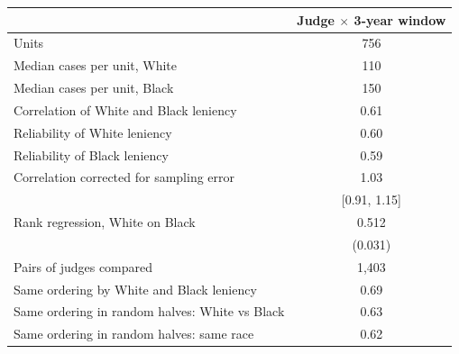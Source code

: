 \begin{tabular}{lc}
\toprule
 & Judge $\times$ 3-year window \\
\midrule
Units & 756 \\
Median cases per unit, White & 110 \\
Median cases per unit, Black & 150 \\
\addlinespace
Correlation of White and Black leniency & 0.61 \\
Reliability of White leniency & 0.60 \\
Reliability of Black leniency & 0.59 \\
Correlation corrected for sampling error & 1.03 \\
 & [0.91, 1.15] \\
Rank regression, White on Black & 0.512 \\
 & (0.031) \\
\addlinespace
Pairs of judges compared & 1,403 \\
Same ordering by White and Black leniency & 0.69 \\
Same ordering in random halves: White vs Black & 0.63 \\
Same ordering in random halves: same race & 0.62 \\
\bottomrule
\end{tabular}
